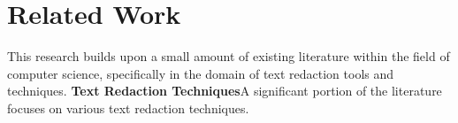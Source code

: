 \section{Related Work}
\label{sec:related_work}

This research builds upon a small amount of existing literature within the field of computer science, specifically in the domain of text redaction tools and techniques. 
\textbf{Text Redaction Techniques}A significant portion of the literature focuses on various text redaction techniques. 
